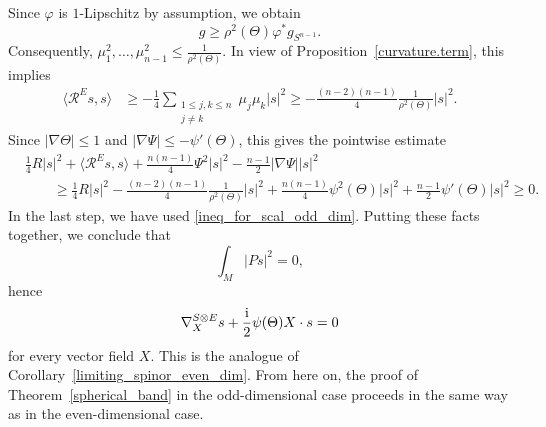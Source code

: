 Since $\varphi$ is $1$-Lipschitz by assumption, we obtain
\[
 g \geq \rho^2(\Theta) \varphi^* g_{S^{n-1}} .
 \]
Consequently, $\mu_1^2,\hdots,\mu_{n-1}^2 \leq \frac{1}{\rho^2(\Theta)}$. In view of Proposition~\ref{curvature.term}, this implies
\begin{align*}
\big\langle \mathcal{R}^{E} s,s \big\rangle
&\geq -\frac{1}{4} \sum_{\substack{1 \leq j,k \leq n\\ j \neq k}} \mu_j \mu_k |s|^2 \geq -\frac{(n-2)(n-1)}{4} \frac{1}{\rho^2(\Theta)} |s|^2.
\end{align*}
Since $|\nabla \Theta| \leq 1$ and $|\nabla \Psi| \leq -\psi'(\Theta)$, this gives the pointwise estimate
\begin{align*}
&\frac{1}{4} R |s|^2 + \big\langle \mathcal{R}^{E} s,s \big\rangle + \frac{n(n-1)}{4} \Psi^2 |s|^2 - \frac{n-1}{2} |\nabla \Psi| |s|^2 \\
&\qquad\geq \frac{1}{4} R |s|^2 - \frac{(n-2)(n-1)}{4} \frac{1}{\rho^2(\Theta)} |s|^2
+ \frac{n(n-1)}{4} \psi^2(\Theta) |s|^2 + \frac{n-1}{2} \psi'(\Theta) |s|^2 \geq 0.
\end{align*}
In the last step, we have used \eqref{ineq_for_scal_odd_dim}.
Putting these facts together, we conclude that
\[
\int_M | P s|^2 = 0,
\]
hence
\[
 \nabla_X^{S \otimes E} s + \frac{\rm i}{2} \psi(\Theta) X \cdot s = 0
\]
for every vector field $X$.
This is the analogue of Corollary~\ref{limiting_spinor_even_dim}.
From here on, the proof of Theorem~\ref{spherical_band} in the odd-dimensional case proceeds in the same way as in the even-dimensional case.
